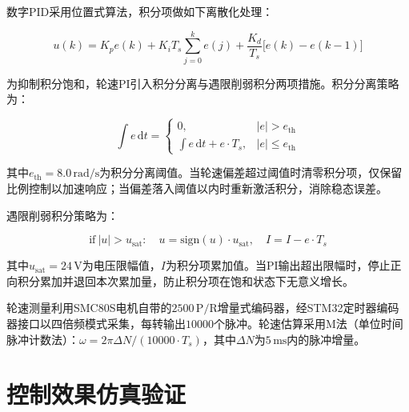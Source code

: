 {{    数字PID采用位置式算法，积分项做如下离散化处理：
    
    \begin{equation}
    u(k) = K_p e(k) + K_i T_s \sum_{j=0}^{k} e(j) + \frac{K_d}{T_s}\bigl[e(k) - e(k-1)\bigr]
    \label{eq:discrete_pid}
    \end{equation}

    为抑制积分饱和，轮速PI引入积分分离与遇限削弱积分两项措施。积分分离策略为：

    \begin{equation}
    \int e\,\mathrm{d}t = \begin{cases} 0, & |e| > e_{\text{th}} \\ \int e\,\mathrm{d}t + e \cdot T_s, & |e| \leq e_{\text{th}} \end{cases}
    \label{eq:integral_separation}
    \end{equation}

    其中$e_{\text{th}}=8.0\,\mathrm{rad/s}$为积分分离阈值。当轮速偏差超过阈值时清零积分项，仅保留比例控制以加速响应；当偏差落入阈值以内时重新激活积分，消除稳态误差。

    遇限削弱积分策略为：

    \begin{equation}
    \text{if}\ |u| > u_{\text{sat}}:\quad u = \mathrm{sign}(u)\cdot u_{\text{sat}},\quad I = I - e \cdot T_s
    \label{eq:anti_windup}
    \end{equation}

    其中$u_{\text{sat}}=24\,\mathrm{V}$为电压限幅值，$I$为积分项累加值。当PI输出超出限幅时，停止正向积分累加并退回本次累加量，防止积分项在饱和状态下无意义增长。

    轮速测量利用SMC80S电机自带的$2500\,\mathrm{P/R}$增量式编码器，经STM32定时器编码器接口以四倍频模式采集，每转输出$10000$个脉冲。轮速估算采用M法（单位时间脉冲计数法）：$\omega = 2\pi \Delta N / (10000 \cdot T_s)$，其中$\Delta N$为$5\,\mathrm{ms}$内的脉冲增量。
    }
    \section{控制效果仿真验证}

}
